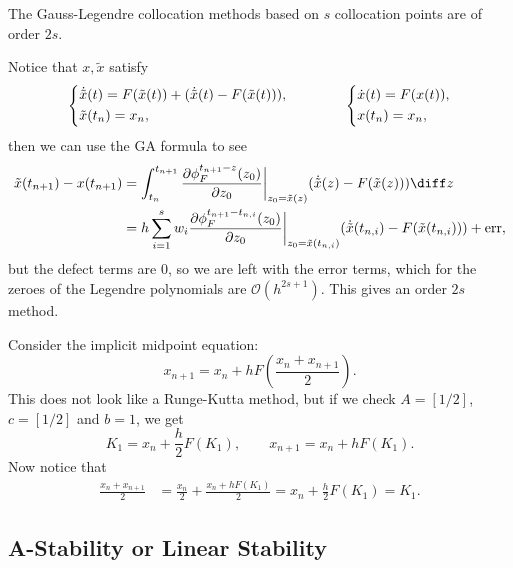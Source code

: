 \documentclass[12pt]{article}
\begin{document}
\begin{theorem}
	The Gauss-Legendre collocation methods based on $s$ collocation points are of order $2s$.
\end{theorem}

\begin{proofbox}
	Notice that $x, \tilde x$ satisfy
	\begin{align*}
		\begin{dcases}
			\dot{\tilde x}(t) = F(\tilde x(t)) + (\dot{\tilde x}(t) - F(\tilde x(t))), \\
			\tilde x(t_n) = x_n,
		\end{dcases}
		\qquad \qquad
		\begin{dcases}
			\dot x(t) = F(x(t)), \\
			x(t_n) = x_n,
		\end{dcases}
	\end{align*}
	then we can use the GA formula to see
	\begin{align*}
		\tilde x(t_{n+1}) - x(t_{n+1}) &= \int_{t_n}^{t_{n+1}} \frac{\partial \phi_{F}^{t_{n+1} - z}(z_0)}{\partial z_0} \biggr|_{z_0 = \tilde x(z)} (\dot{\tilde x}(z) - F(\tilde x(z))) \diff z \\
					       &= h \sum_{i = 1}^s w_i \frac{\partial \phi_F^{t_{n+1} - t_{n,i}}(z_0)}{\partial z_0} \biggr|_{z_0 = \tilde x(t_{n,i})} (\dot{\tilde x}(t_{n,i}) - F (\tilde x(t_{n,i}))) + \mathrm{err},
	\end{align*}
	but the defect terms are $0$, so we are left with the error terms, which for the zeroes of the Legendre polynomials are $\mathcal{O}(h^{2s+1})$. This gives an order $2s$ method.
\end{proofbox}

\begin{exbox}
	Consider the implicit midpoint equation:
	\[
	x_{n+1} = x_n + h F \left( \frac{x_n + x_{n+1}}{2} \right).
	\]
	This does not look like a Runge-Kutta method, but if we check $A = [1/2]$, $c = [1/2]$ and $b = 1$, we get
	\[
	K_1 = x_n + \frac h2 F(K_1), \qquad x_{n+1} = x_n + h F(K_1).
	\]
	Now notice that
	\begin{align*}
		\frac{x_n + x_{n+1}}{2} &= \frac{x_n}{2} + \frac{x_n + h F(K_1)}{2} = x_n + \frac h2 F(K_1) = K_1.
	\end{align*}
\end{exbox}

\subsection{A-Stability or Linear Stability}%
\label{sub:stabs}
\end{document}
